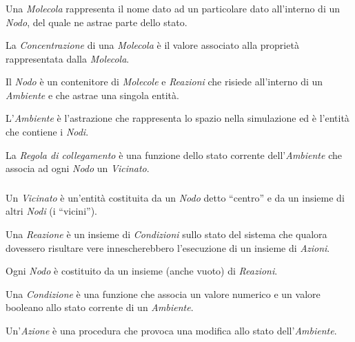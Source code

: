 \documentclass[%
]{beamer}
\begin{document}
    \begin{frame}
        \frametitle{\insertsection}
        \framesubtitle{\insertsubsection}

        \begin{description}[<+->]
            \item[Molecola]\label{itm:mol}
                Una \emph{Molecola} rappresenta il nome dato ad un particolare dato all'interno di un \emph{Nodo}, del quale ne astrae parte dello stato.

            \item[Concentrazione]\label{itm:conc}
                La \emph{Concentrazione} di una \emph{Molecola} è il valore associato alla proprietà rappresentata dalla \emph{Molecola}.

            \item[Nodo]\label{itm:node}
                Il \emph{Nodo} è un contenitore di \emph{Molecole} e \emph{Reazioni} che risiede all'interno di un \emph{Ambiente} e che astrae una singola entità.

            \item[Ambiente]\label{itm:env}
                L'\emph{Ambiente} è l'astrazione che rappresenta lo spazio nella simulazione ed è l'entità che contiene i \emph{Nodi}.

            \item[Regola di collegamento]\label{itm:linkr}
                La \emph{Regola di collegamento} è una funzione dello stato corrente dell'\emph{Ambiente} che associa ad ogni \emph{Nodo} un \emph{Vicinato}.
        \end{description}
    \end{frame}

    \begin{frame}
        \frametitle{\insertsection}
        \framesubtitle{\insertsubsection}

        \begin{description}[<+->]
            \item[Vicinato]\label{itm:neigh}
                Un \emph{Vicinato} è un'entità costituita da un \emph{Nodo} detto ``centro'' e da un insieme di altri \emph{Nodi} (i ``vicini'').

            \item[Reazione]\label{itm:react}
                Una \emph{Reazione} è un insieme di \emph{Condizioni} sullo stato del sistema che qualora dovessero risultare vere innescherebbero l'esecuzione di un insieme di \emph{Azioni}.

                Ogni \emph{Nodo} è costituito da un insieme (anche vuoto) di \emph{Reazioni}.

            \item[Condizione]\label{itm:cond}
                Una \emph{Condizione} è una funzione che associa un valore numerico e un valore booleano allo stato corrente di un \emph{Ambiente}.

            \item[Azione]\label{itm:act}
                Un'\emph{Azione} è una procedura che provoca una modifica allo stato dell'\emph{Ambiente}.
        \end{description}
    \end{frame}
\end{document}
